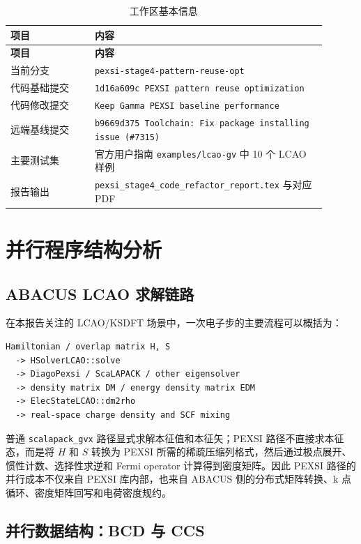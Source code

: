 \documentclass[a4paper,11pt]{article}
\newcommand{\code}[1]{\texttt{#1}}
\begin{document}
\begin{longtable}{@{}p{0.24\linewidth}p{0.66\linewidth}@{}}
\caption{工作区基本信息}\\
\toprule
\textbf{项目} & \textbf{内容}\\
\midrule
\endfirsthead
\toprule
\textbf{项目} & \textbf{内容}\\
\midrule
\endhead
当前分支 & \code{pexsi-stage4-pattern-reuse-opt}\\
代码基础提交 & \code{1d16a609c PEXSI pattern reuse optimization}\\
代码修改提交 & \code{Keep Gamma PEXSI baseline performance}\\
远端基线提交 & \code{b9669d375 Toolchain: Fix package installing issue (\#7315)}\\
主要测试集 & 官方用户指南 \code{examples/lcao-gv} 中 10 个 LCAO 样例\\
报告输出 & \code{pexsi\_stage4\_code\_refactor\_report.tex} 与对应 PDF\\
\bottomrule
\end{longtable}

\section{并行程序结构分析}

\subsection{ABACUS LCAO 求解链路}

在本报告关注的 LCAO/KSDFT 场景中，一次电子步的主要流程可以概括为：

\begin{verbatim}
Hamiltonian / overlap matrix H, S
  -> HSolverLCAO::solve
  -> DiagoPexsi / ScaLAPACK / other eigensolver
  -> density matrix DM / energy density matrix EDM
  -> ElecStateLCAO::dm2rho
  -> real-space charge density and SCF mixing
\end{verbatim}

普通 \code{scalapack\_gvx} 路径显式求解本征值和本征矢；PEXSI 路径不直接求本征态，而是将 \(H\) 和 \(S\) 转换为 PEXSI 所需的稀疏压缩列格式，然后通过极点展开、惯性计数、选择性求逆和 Fermi operator 计算得到密度矩阵。因此 PEXSI 路径的并行成本不仅来自 PEXSI 库内部，也来自 ABACUS 侧的分布式矩阵转换、k 点循环、密度矩阵回写和电荷密度规约。

\subsection{并行数据结构：BCD 与 CCS}
\end{document}
